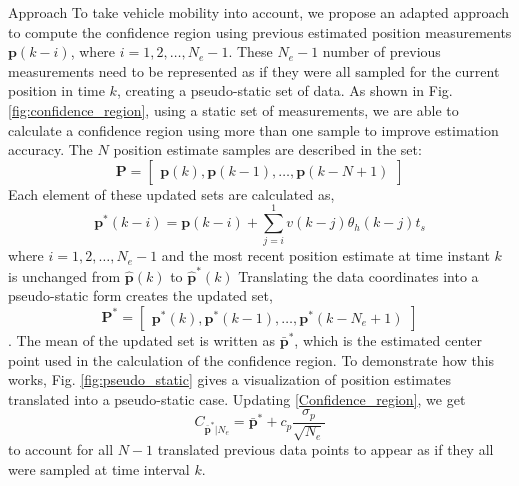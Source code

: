 \begin{section}{Approach}
To take vehicle mobility into account, we propose an adapted approach to compute the confidence region using previous estimated position measurements $\bm{p}(k-i)$, where $i=1,2,\dots,N_e-1$. These $N_e-1$ number of previous measurements need to be represented as if they were all sampled for the current position in time $k$, creating a pseudo-static set of data. As shown in Fig. \ref{fig:confidence_region}, using a static set of measurements, we are able to calculate a confidence region using more than one sample to improve estimation accuracy. The $N$ position estimate samples are described in the set:
\begin{equation}
    \bm{P}=\begin{bmatrix} \bm{p}(k) ,\bm{p}(k-1),\dots,\bm{p}(k-N+1) \end{bmatrix} 
\end{equation}
Each element of these updated sets are calculated as,
	\begin{equation}
	\bm{p}^*(k-i) = \bm{p}(k-i)+\sum_{j=i}^1 v(k-j)\theta_h(k-j)t_s 
	\end{equation}
where $i=1,2,\dots,N_e-1$ and the most recent position estimate at time instant $k$ is unchanged from $\hat{\bm{p}}(k)$ to $\hat{\bm{p}}^*(k)$
Translating the data coordinates into a pseudo-static form creates the updated set,
\begin{equation}
    \bm{P}^*=\begin{bmatrix} \bm{p}^*(k) ,\bm{p}^*(k-1),\dots,\bm{p}^*(k-N_e+1) \end{bmatrix} \nonumber
\end{equation}
. The mean of the updated set is written as $\bar{\bm{p}}^*$, which is the estimated center point used in the calculation of the confidence region. To demonstrate how this works, Fig. \ref{fig:pseudo_static} gives a visualization of position estimates translated into a pseudo-static case. Updating \eqref{Confidence_region}, we get
    \begin{equation}
    \label{Confidence_region_updated}
		C_{\bar{\bm{p}}^*|N_e} = \bar{\bm{p}}^* + c_p\frac{\sigma_p}{\sqrt{N_e}}
	\end{equation}
 to account for all $N-1$ translated previous data points to appear as if they all were sampled at time interval $k$.




\end{section}
